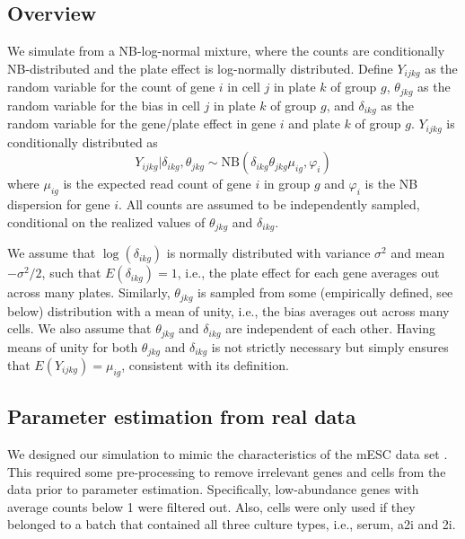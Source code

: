 \documentclass{article}
\begin{document}
\subsection{Overview}
We simulate from a NB-log-normal mixture, where the counts are conditionally NB-distributed and the plate effect is log-normally distributed.
Define $Y_{ijkg}$ as the random variable for the count of gene $i$ in cell $j$ in plate $k$ of group $g$, 
    $\theta_{jkg}$ as the random variable for the bias in cell $j$ in plate $k$ of group $g$,
    and $\delta_{ikg}$ as the random variable for the gene/plate effect in gene $i$ and plate $k$ of group $g$.
$Y_{ijkg}$ is conditionally distributed as
\[
    Y_{ijkg} | \delta_{ikg}, \theta_{jkg} \sim \mbox{NB}(\delta_{ikg}\theta_{jkg}\mu_{ig}, \varphi_i)
\]
where $\mu_{ig}$ is the expected read count of gene $i$ in group $g$ and $\varphi_i$ is the NB dispersion for gene $i$.
All counts are assumed to be independently sampled, conditional on the realized values of $\theta_{jkg}$ and $\delta_{ikg}$.

We assume that $\log(\delta_{ikg})$ is normally distributed with variance $\sigma^2$ and mean $-\sigma^2/2$, such that $E(\delta_{ikg}) = 1$, i.e., the plate effect for each gene averages out across many plates.
Similarly, $\theta_{jkg}$ is sampled from some (empirically defined, see below) distribution with a mean of unity, i.e., the bias averages out across many cells.
We also assume that $\theta_{jkg}$ and $\delta_{ikg}$ are independent of each other.
Having means of unity for both $\theta_{jkg}$ and $\delta_{ikg}$ is not strictly necessary but simply ensures that $E(Y_{ijkg})=\mu_{ig}$, consistent with its definition.

\subsection{Parameter estimation from real data}
We designed our simulation to mimic the characteristics of the mESC data set \citep{kolod2015single}.
This required some pre-processing to remove irrelevant genes and cells from the data prior to parameter estimation.
Specifically, low-abundance genes with average counts below 1 were filtered out.
Also, cells were only used if they belonged to a batch that contained all three culture types, i.e., serum, a2i and 2i.
\end{document}

